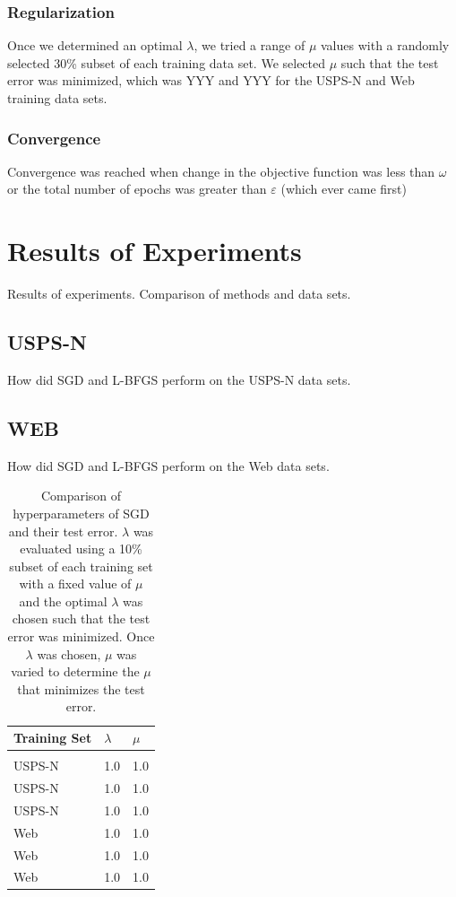 \documentclass[10pt]{article}
\begin{document}
\subsubsection{Regularization}
Once we determined an optimal $\lambda$, we tried a range of $\mu$ values with a randomly selected 30\% subset of each training data set. We selected $\mu$ such that the test error was minimized, which was YYY and YYY for the USPS-N and Web training data sets.

\subsubsection{Convergence}
Convergence was reached when change in the objective function was less than $\omega$ or the total number of epochs was greater than $\varepsilon$ (which ever came first)



\section{Results of Experiments}
\label{sec:results}

Results of experiments. Comparison of methods and data sets.

\subsection{USPS-N}
How did SGD and L-BFGS perform on the USPS-N data sets.

\subsection{WEB}
How did SGD and L-BFGS perform on the Web data sets.




\begin{table}[t]
\caption{Comparison of hyperparameters of SGD and their test error. $\lambda$ was evaluated using a 10\% subset of each training set with a fixed value of $\mu$ and the optimal $\lambda$ was chosen such that the test error was minimized. Once $\lambda$ was chosen, $\mu$ was varied to determine the $\mu$ that minimizes the test error.}
\label{tab-hyperparameters}
\begin{center}
\begin{tabular}{l|ll}
Training Set & $\lambda$  & $\mu$
\\ \hline \\
USPS-N & 1.0  & 1.0 \\
USPS-N & 1.0  & 1.0 \\
USPS-N & 1.0  & 1.0 \\
Web & 1.0  & 1.0 \\
Web & 1.0  & 1.0 \\
Web & 1.0  & 1.0 \\
\end{tabular}
\end{center}
\end{table}
\end{document}
